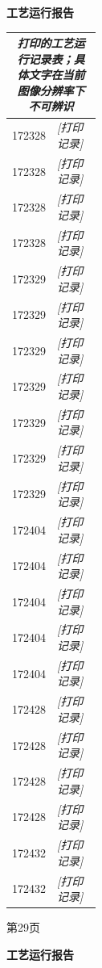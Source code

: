 \documentclass[UTF8,10pt,a4paper,fontset=fandol]{ctexart}
\begin{document}
\begin{center}
\begin{minipage}[t]{0.47\textwidth}
\centering
\textbf{工艺运行报告}

\small
\begin{tabularx}{\linewidth}{|p{0.22\linewidth}|X|}
\hline
\multicolumn{2}{|c|}{\textit{打印的工艺运行记录表；具体文字在当前图像分辨率下不可辨识}}\\
\hline
172328 & \textit{[打印记录]}\\ \hline
172328 & \textit{[打印记录]}\\ \hline
172328 & \textit{[打印记录]}\\ \hline
172328 & \textit{[打印记录]}\\ \hline
172329 & \textit{[打印记录]}\\ \hline
172329 & \textit{[打印记录]}\\ \hline
172329 & \textit{[打印记录]}\\ \hline
172329 & \textit{[打印记录]}\\ \hline
172329 & \textit{[打印记录]}\\ \hline
172329 & \textit{[打印记录]}\\ \hline
172329 & \textit{[打印记录]}\\ \hline
172404 & \textit{[打印记录]}\\ \hline
172404 & \textit{[打印记录]}\\ \hline
172404 & \textit{[打印记录]}\\ \hline
172404 & \textit{[打印记录]}\\ \hline
172404 & \textit{[打印记录]}\\ \hline
172428 & \textit{[打印记录]}\\ \hline
172428 & \textit{[打印记录]}\\ \hline
172428 & \textit{[打印记录]}\\ \hline
172428 & \textit{[打印记录]}\\ \hline
172432 & \textit{[打印记录]}\\ \hline
172432 & \textit{[打印记录]}\\ \hline
\end{tabularx}

\vspace{1mm}
第29页
\end{minipage}
\hfill
\begin{minipage}[t]{0.47\textwidth}
\centering
\textbf{工艺运行报告}


\end{minipage}
\end{center}
\end{document}
